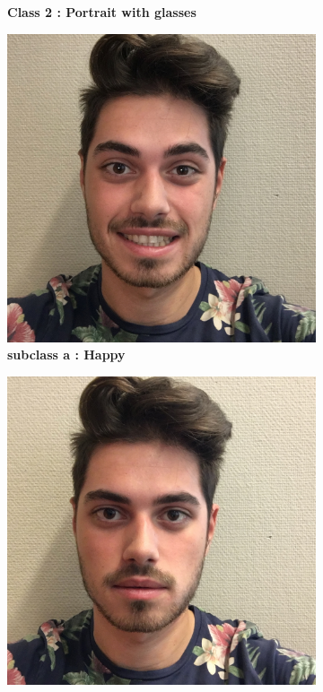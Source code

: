 \begin{figure}[!hp]
\begin{subfigure}[t]{0.18\textwidth}
	\captionsetup{font=small}
	\caption{\bf Class 2 : Portrait with glasses}
	\label{fig:figure1_2}
    \end{subfigure} 
    \begin{subfigure}[t]{0.18\textwidth}
    \centering
	\includegraphics[height=0.05\textheight]{dataset/IMG_1012.jpg}
	\captionsetup{font=small}
	\caption{\bf subclass a : Happy}
    \label{fig:figure1_3}
	\end{subfigure}
    \begin{subfigure}[t]{0.18\textwidth}
    \centering
    \includegraphics[height=0.05\textheight]{dataset/IMG_0997.jpg}

\end{subfigure}
\end{figure}
